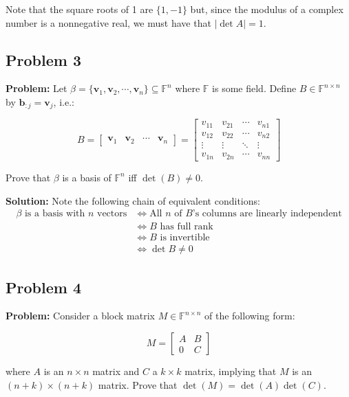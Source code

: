 \documentclass{article}
\renewcommand\vec{\mathbf}
\begin{document}
\begin{enumerate}[label=\textbf{\alph*)}]
    Note that the square roots of 1 are $\{1,-1\}$ but, since the modulus of a complex number is a nonnegative real, we must have that $\lvert\det A\rvert=1$.
\end{enumerate}

\subsection*{Problem 3}
\noindent\textbf{Problem:} Let $\beta=\{\vec v_1,\vec v_2,\cdots,\vec v_n\}\subseteq\mathbb F^n$ where $\mathbb F$ is some field. Define $B\in\mathbb F^{n\times n}$ by $\vec b_{:j}=\vec v_j$, i.e.:

$$B=\begin{bmatrix}
  \vec v_1&\vec v_2&\cdots&\vec v_n
\end{bmatrix}=\begin{bmatrix}
  v_{11}&v_{21}&\cdots&v_{n1}\\
  v_{12}&v_{22}&\cdots&v_{n2}\\
  \vdots&\vdots&\ddots&\vdots\\
  v_{1n}&v_{2n}&\cdots&v_{nn}
\end{bmatrix}$$

Prove that $\beta$ is a basis of $\mathbb F^n$ iff $\det(B)\not=0$.
\bigskip

\noindent\textbf{Solution:} Note the following chain of equivalent conditions:
\begin{align*}
  \text{$\beta$ is a basis with $n$ vectors}&\iff \text{All $n$ of $B$'s columns are linearly independent}\\
  &\iff\text{$B$ has full rank}\\
  &\iff\text{$B$ is invertible}\\
  &\iff \det B\not=0
\end{align*}

\subsection*{Problem 4}
\noindent\textbf{Problem:} Consider a block matrix $M\in\mathbb F^{n\times n}$ of the following form:

$$M=\begin{bmatrix}
  A&B\\0&C
\end{bmatrix}$$

where $A$ is an $n\times n$ matrix and $C$ a $k\times k$ matrix, implying that $M$ is an $(n+k)\times(n+k)$ matrix. Prove that $\det(M)=\det(A)\det(C)$.
\bigskip
\end{document}
